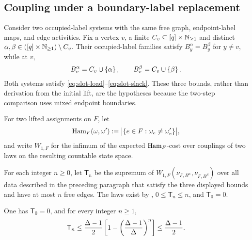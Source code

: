 \subsection{Coupling under a boundary-label replacement}

Consider two occupied-label systems with the same free graph,
endpoint-label maps, and edge activities.  Fix a vertex \(v\), a finite
\(C_v\subseteq[q]\times\mathbb N_{\ge1}\) and distinct
\(\alpha,\beta\in
([q]\times\mathbb N_{\ge1})\setminus C_v\).
Their occupied-label families satisfy
\(B_y^\alpha=B_y^\beta\) for \(y\ne v\), while at \(v\),
\[
  B_v^\alpha=C_v\cup\left\{\alpha\right\},
  \qquad
  B_v^\beta=C_v\cup\left\{\beta\right\}.
\]
Both systems satisfy \eqref{eq:slot-load}--\eqref{eq:slot-slack}.  These
three bounds, rather than derivation from the initial lift, are the
hypotheses because the two-step comparison uses mixed endpoint boundaries.

For two lifted assignments on \(F\), let
\[
  \operatorname{Ham}_F(\omega,\omega')
  :=\bigl|\{e\in F:\omega_e\ne\omega'_e\}\bigr|,
\]
and write \(W_{1,F}\) for the infimum of the expected \(\operatorname{Ham}_F\)-cost
over couplings of two laws on the resulting countable state space.

For each integer \(n\ge0\), let \(\mathsf T_n\) be the supremum of
\(W_{1,F}(\nu_{F,B^\alpha},\nu_{F,B^\beta})\) over all data described in
the preceding paragraph that satisfy the three displayed bounds and have
at most \(n\) free edges.  The laws exist by ,
\(0\le\mathsf T_n\le n\), and \(\mathsf T_0=0\).

\begin{lemma}\label{lem:edge-one-label}
One has \(\mathsf T_0=0\), and for every integer \(n\ge1\),
\begin{equation}\label{eq:edge-one-label-bound}
  \mathsf T_n
  \le
  \frac{\Delta-1}{2}
  \left[
    1-\left(\frac{\Delta-1}{\Delta}\right)^n
  \right]
  \le\frac{\Delta-1}{2}.
\end{equation}
\end{lemma}

